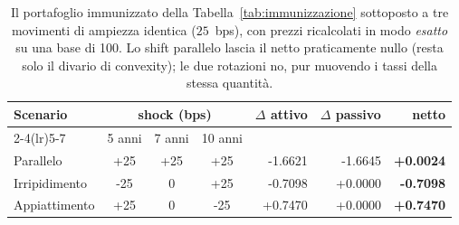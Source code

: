 \begin{table}[H]\centering\small
\caption{Il portafoglio immunizzato della Tabella~\ref{tab:immunizzazione} sottoposto a tre movimenti di ampiezza identica ($25$~bps), con prezzi ricalcolati in modo \emph{esatto} su una base di 100. Lo shift parallelo lascia il netto praticamente nullo (resta solo il divario di convexity); le due rotazioni no, pur muovendo i tassi della stessa quantit\`a.}
\label{tab:shock-immunizzazione}\renewcommand{\arraystretch}{1.25}
\begin{tabular}{lcccrrr}
\toprule
\textbf{Scenario} & \multicolumn{3}{c}{shock (bps)} & $\Delta$ attivo & $\Delta$ passivo & \textbf{netto}\\
\cmidrule(lr){2-4}\cmidrule(lr){5-7}
& 5 anni & 7 anni & 10 anni & & & \\
\midrule
\rowcolor{rowtint}Parallelo & +25 & +25 & +25 & -1.6621 & -1.6645 & \textbf{+0.0024}\\
Irripidimento & -25 & 0 & +25 & -0.7098 & +0.0000 & \textbf{-0.7098}\\
\rowcolor{rowtint}Appiattimento & +25 & 0 & -25 & +0.7470 & +0.0000 & \textbf{+0.7470}\\
\bottomrule
\end{tabular}
\end{table}
